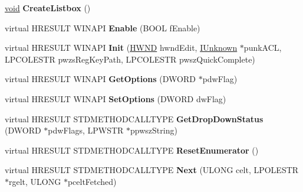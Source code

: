 \begin{DoxyCompactItemize}
\item 
\mbox{\label{class_c_auto_complete_a6f92808e5251044646f4e02c4117073a}} 
\hyperlink{interfacevoid}{void} {\bfseries Create\+Listbox} ()
\item 
\mbox{\label{class_c_auto_complete_a1aaea1f34c80c90d88866225480c4dcd}} 
virtual H\+R\+E\+S\+U\+LT W\+I\+N\+A\+PI {\bfseries Enable} (B\+O\+OL f\+Enable)
\item 
\mbox{\label{class_c_auto_complete_a71e411d221de25530be4abe752b43525}} 
virtual H\+R\+E\+S\+U\+LT W\+I\+N\+A\+PI {\bfseries Init} (\hyperlink{interfacevoid}{H\+W\+ND} hwnd\+Edit, \hyperlink{interface_i_unknown}{I\+Unknown} $\ast$punk\+A\+CL, L\+P\+C\+O\+L\+E\+S\+TR pwzs\+Reg\+Key\+Path, L\+P\+C\+O\+L\+E\+S\+TR pwsz\+Quick\+Complete)
\item 
\mbox{\label{class_c_auto_complete_a4b04260f2c5d8571519a5628997ad482}} 
virtual H\+R\+E\+S\+U\+LT W\+I\+N\+A\+PI {\bfseries Get\+Options} (D\+W\+O\+RD $\ast$pdw\+Flag)
\item 
\mbox{\label{class_c_auto_complete_ac7cf261892a4c87d6e39e44b80c37b38}} 
virtual H\+R\+E\+S\+U\+LT W\+I\+N\+A\+PI {\bfseries Set\+Options} (D\+W\+O\+RD dw\+Flag)
\item 
\mbox{\label{class_c_auto_complete_ad3c1c17052bdd0b051ba7d4c01557a12}} 
virtual H\+R\+E\+S\+U\+LT S\+T\+D\+M\+E\+T\+H\+O\+D\+C\+A\+L\+L\+T\+Y\+PE {\bfseries Get\+Drop\+Down\+Status} (D\+W\+O\+RD $\ast$pdw\+Flags, L\+P\+W\+S\+TR $\ast$ppwsz\+String)
\item 
\mbox{\label{class_c_auto_complete_afe75b6cc5432e6cb1030bb89b381f37d}} 
virtual H\+R\+E\+S\+U\+LT S\+T\+D\+M\+E\+T\+H\+O\+D\+C\+A\+L\+L\+T\+Y\+PE {\bfseries Reset\+Enumerator} ()
\item 
\mbox{\label{class_c_auto_complete_a5d4f88623304a3e52377fcbdcebf211e}} 
virtual H\+R\+E\+S\+U\+LT S\+T\+D\+M\+E\+T\+H\+O\+D\+C\+A\+L\+L\+T\+Y\+PE {\bfseries Next} (U\+L\+O\+NG celt, L\+P\+O\+L\+E\+S\+TR $\ast$rgelt, U\+L\+O\+NG $\ast$pcelt\+Fetched)

\end{DoxyCompactItemize}
